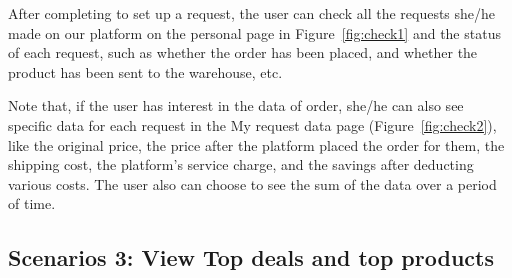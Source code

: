 After completing to set up a request, the user can check all the requests she/he made on our platform on the personal page in Figure~\ref{fig:check1} and the status of each request, such as whether the order has been placed, and whether the product has been sent to the warehouse, etc.

Note that, if the user has interest in the data of order, she/he can also see specific data for each request in the My request data page (Figure~\ref{fig:check2}), like the original price, the price after the platform placed the order for them, the shipping cost, the platform's service charge, and the savings after deducting various costs. The user also can choose to see the sum of the data over a period of time.

\subsection{Scenarios 3: View Top deals and top products}

